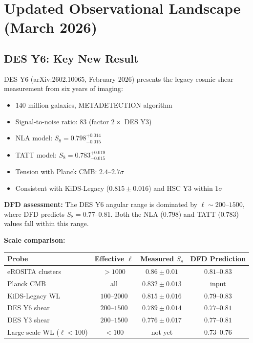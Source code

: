 \documentclass[11pt,a4paper]{article}
\begin{document}
\section{Updated Observational Landscape (March 2026)}
\label{sec:landscape}

\subsection{DES Y6: Key New Result}

\begin{robustbox}[DES Y6 Cosmic Shear: $S_8 = 0.789 \pm 0.014$]

DES Y6 (arXiv:2602.10065, February 2026) presents the legacy cosmic
shear measurement from six years of imaging:

\begin{itemize}[nosep]
\item 140 million galaxies, METADETECTION algorithm
\item Signal-to-noise ratio: 83 (factor $2\times$ DES Y3)
\item NLA model: $S_8 = 0.798^{+0.014}_{-0.015}$
\item TATT model: $S_8 = 0.783^{+0.019}_{-0.015}$
\item Tension with Planck CMB: $2.4$--$2.7\sigma$
\item Consistent with KiDS-Legacy ($0.815 \pm 0.016$) and
  HSC Y3 within $1\sigma$
\end{itemize}

\textbf{DFD assessment:}
The DES Y6 angular range is dominated by $\ell \sim 200$--$1500$,
where DFD predicts $S_8 = 0.77$--$0.81$. Both the NLA ($0.798$) and
TATT ($0.783$) values fall within this range.

\textbf{Scale comparison:}
\begin{center}
\begin{tabular}{lccc}
\toprule
\textbf{Probe} & \textbf{Effective $\ell$} & \textbf{Measured $S_8$}
& \textbf{DFD Prediction} \\
\midrule
eROSITA clusters & $> 1000$ & $0.86 \pm 0.01$ & $0.81$--$0.83$ \\
Planck CMB & all & $0.832 \pm 0.013$ & input \\
KiDS-Legacy WL & $100$--$2000$ & $0.815 \pm 0.016$ & $0.79$--$0.83$ \\
DES Y6 shear & $200$--$1500$ & $0.789 \pm 0.014$ & $0.77$--$0.81$ \\
DES Y3 shear & $200$--$1500$ & $0.776 \pm 0.017$ & $0.77$--$0.81$ \\
Large-scale WL ($\ell < 100$) & $< 100$ & not yet & $0.73$--$0.76$ \\
\bottomrule
\end{tabular}
\end{center}


\end{robustbox}
\end{document}

